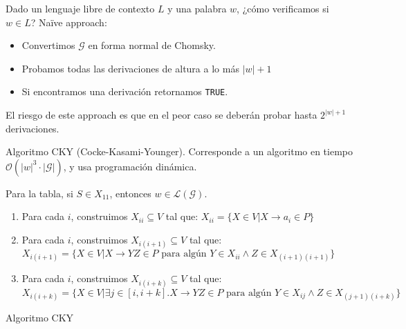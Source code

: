\documentclass[a4paper,twoside,master.tex]{article}
\begin{document}

Dado un lenguaje libre de contexto $L$ y una palabra $w$, ¿cómo verificamos si $w \in L$? Naïve approach:
\begin{itemize}
    \item Convertimos $\mathcal{G}$ en forma normal de Chomsky.
    \item Probamos todas las derivaciones de altura a lo más $|w| + 1$
    \item Si encontramos una derivación retornamos \texttt{TRUE}.
\end{itemize}
El riesgo de este approach es que en el peor caso se deberán probar hasta $2^{|w| + 1}$ derivaciones.


Algoritmo CKY (Cocke-Kasami-Younger). Corresponde a un algoritmo en tiempo $\mathcal{O}(|w|^3 \cdot |\mathcal{G}|)$, y usa programación dinámica.

Para la tabla, si $S \in X_{11}$, entonces $w \in \mathcal{L}(\mathcal{G})$.

\begin{enumerate}
    \item Para cada $i$, construimos $X_{ii} \subseteq V$ tal que: $X_{ii} = \{ X \in V | X \to a_i \in P \}$
    \item Para cada $i$, construimos $X_{i(i+1)} \subseteq V$ tal que: $X_{i(i+1)} = \{ X \in V | X \to YZ \in P \text{ para algún } Y \in X_{ii} \wedge Z \in X_{(i+1)(i+1)} \}$
    \item Para cada $i$, construimos $X_{i(i+k)} \subseteq V$ tal que: $X_{i(i+k)} = \{ X \in V | \exists j \in [i, i + k]. X \to YZ \in P \text{ para algún } Y \in X_{ij} \wedge Z \in X_{(j+1)(i+k)} \}$
\end{enumerate}

\begin{algorithm}
    \caption{Algoritmo CKY}


\end{algorithm}
\end{document}
